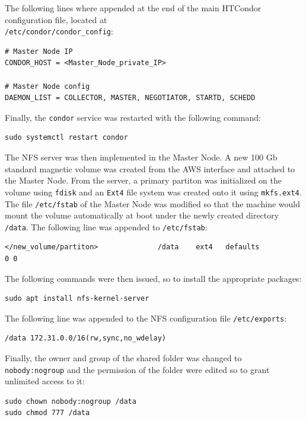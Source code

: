 \documentclass{article}
\begin{document}
The following lines where appended at the end of the main HTCondor configuration file, located at\\
\texttt{/etc/condor/condor\_config}:

\begin{lstlisting}
# Master Node IP
CONDOR_HOST = <Master_Node_private_IP>

# Master Node config 
DAEMON_LIST = COLLECTOR, MASTER, NEGOTIATOR, STARTD, SCHEDD
\end{lstlisting}

Finally, the \texttt{condor} service was restarted with the following command:

\begin{lstlisting}
sudo systemctl restart condor
\end{lstlisting}

The NFS server was then implemented in the Master Node.
A new 100 Gb standard magnetic volume was created from the AWS interface and attached to the Master Node.
From the server, a primary partiton was initialized on the volume using \texttt{fdisk} and an \texttt{Ext4} file system was created onto it using \texttt{mkfs.ext4}.
The file \texttt{/etc/fstab} of the Master Node was modified so that the machine would mount the volume automatically at boot under the newly created directory \texttt{/data}.
The following line was appended to \texttt{/etc/fstab}:

\begin{lstlisting}
</new_volume/partiton>              /data    ext4   defaults                0 0
\end{lstlisting}

The following commands were then issued, so to install the appropriate packages:

\begin{lstlisting}
sudo apt install nfs-kernel-server
\end{lstlisting}

The following line was appended to the NFS configuration file \texttt{/etc/exports}:

\begin{lstlisting}
/data 172.31.0.0/16(rw,sync,no_wdelay)
\end{lstlisting}

Finally, the owner and group of the shared folder was changed to \texttt{nobody:nogroup} and the permission of the folder were edited so to grant unlimited access to it:

\begin{lstlisting}
sudo chown nobody:nogroup /data
sudo chmod 777 /data
\end{lstlisting}
\end{document}
